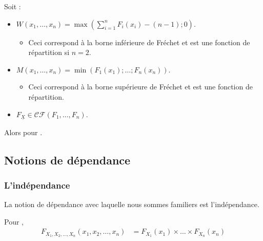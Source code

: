 \documentclass[10pt, french]{article}
\begin{document}
\begin{multicols*}{2}
\begin{definitionNOHFILLprop}[Théorème 13.2]

Soit : 
\begin{itemize}
	\item	$W(x_{1}, \dots, x_{n})	=	\max\left(\sum_{i = 1}^{n} F_{i}(x_{i}) - (n - 1); 0\right)$.
		\begin{itemize}
		\item	Ceci correspond à la borne inférieure de Fréchet et est une fonction de répartition si $n = 2$.
		\end{itemize}
	\item	$M(x_{1}, \dots, x_{n})	=	\min\left(F_{1}(x_{1}); \dots; F_{n}(x_{n})\right)$.
		\begin{itemize}
		\item	Ceci correspond à la borne supérieure de Fréchet et est une fonction de répartition.
		\end{itemize}
	\item	$F_{\underline{X}} \in \mathcal{CF}(F_{1}, \dots, F_{n})$.
\end{itemize}

Alors  pour . 
\end{definitionNOHFILLprop}


\columnbreak
\subsection{Notions de dépendance}
\subsubsection{L'indépendance}
La notion de dépendance avec laquelle nous sommes familiers est l'indépendance.
\begin{definitionNOHFILLprop}[Indépendance]
Pour ,
\begin{align*}
	F_{X_{1}, X_{2}, \dots, X_{n}}(x_{1}, x_{2}, \dots, x_{n})
	&=	F_{X_{1}}(x_{1}) \times \dots \times F_{X_{n}}(x_{n})
\end{align*}
\end{definitionNOHFILLprop}


\end{multicols*}
\end{document}
